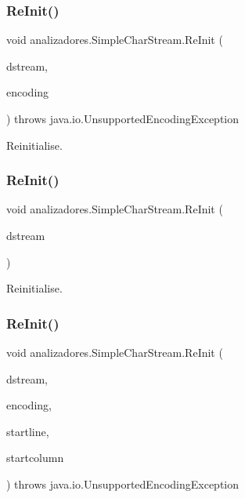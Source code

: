 \subsubsection{\texorpdfstring{Re\+Init()}{ReInit()}\hspace{0.1cm}{\footnotesize\ttfamily [6/9]}}
{\footnotesize\ttfamily void analizadores.\+Simple\+Char\+Stream.\+Re\+Init (\begin{DoxyParamCaption}\item[{java.\+io.\+Input\+Stream}]{dstream,  }\item[{String}]{encoding }\end{DoxyParamCaption}) throws java.\+io.\+Unsupported\+Encoding\+Exception}

Reinitialise. \mbox{\label{classanalizadores_1_1_simple_char_stream_a3fc08691c124d2c6c9dd1f5edfbc1fd3}} 
\subsubsection{\texorpdfstring{Re\+Init()}{ReInit()}\hspace{0.1cm}{\footnotesize\ttfamily [7/9]}}
{\footnotesize\ttfamily void analizadores.\+Simple\+Char\+Stream.\+Re\+Init (\begin{DoxyParamCaption}\item[{java.\+io.\+Input\+Stream}]{dstream }\end{DoxyParamCaption})}

Reinitialise. \mbox{\label{classanalizadores_1_1_simple_char_stream_acd17c0194c5b3d2b3506782e57793e78}} 
\subsubsection{\texorpdfstring{Re\+Init()}{ReInit()}\hspace{0.1cm}{\footnotesize\ttfamily [8/9]}}
{\footnotesize\ttfamily void analizadores.\+Simple\+Char\+Stream.\+Re\+Init (\begin{DoxyParamCaption}\item[{java.\+io.\+Input\+Stream}]{dstream,  }\item[{String}]{encoding,  }\item[{int}]{startline,  }\item[{int}]{startcolumn }\end{DoxyParamCaption}) throws java.\+io.\+Unsupported\+Encoding\+Exception}

